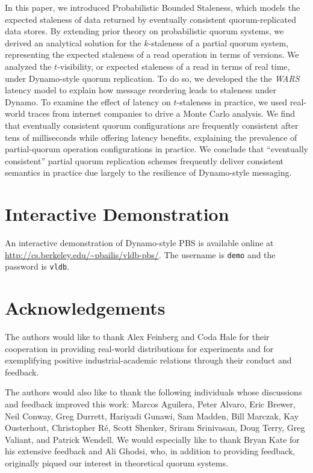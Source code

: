 \documentclass{vldb}
\newcommand{\sectionskip}{-0em}
\begin{document}
In this paper, we introduced Probabilistic Bounded Staleness, which
models the expected staleness of data returned by eventually
consistent quorum-replicated data stores.  By extending prior theory
on probabilistic quorum systems, we derived an analytical solution for
the $k$-staleness of a partial quorum system, representing the
expected staleness of a read operation in terms of versions.  We
analyzed the $t$-visibility, or expected staleness of a read in terms
of real time, under Dynamo-style quorum replication.  To do so, we
developed the the \textit{WARS} latency model to explain how message
reordering leads to staleness under Dynamo.  To examine the effect of
latency on $t$-staleness in practice, we used real-world traces from
internet companies to drive a Monte Carlo analysis.  We find that
eventually consistent quorum configurations are frequently consistent
after tens of milliseconds while offering latency benefits, explaining
the prevalence of partial-quorum operation configurations in practice.
We conclude that ``eventually consistent'' partial quorum replication
schemes frequently deliver consistent semantics in practice due
largely to the resilience of Dynamo-style messaging.

\vspace{\sectionskip}\section*{Interactive Demonstration}
An interactive demonstration of Dynamo-style PBS is available online
at \url{http://cs.berkeley.edu/~pbailis/vldb-pbs/}.  The username is
\texttt{demo} and the password is \texttt{vldb}.

\section*{Acknowledgements}

The authors would like to thank Alex Feinberg and Coda Hale for their
cooperation in providing real-world distributions for experiments and
for exemplifying positive industrial-academic relations through their
conduct and feedback.

The authors would also like to thank the following individuals whose
discussions and feedback improved this work: Marcos Aguilera, Peter
Alvaro, Eric Brewer, Neil Conway, Greg Durrett, Hariyadi Gunawi, Sam
Madden, Bill Marczak, Kay Ousterhout, Christopher R\'e, Scott Shenker,
Sriram Srinivasan, Doug Terry, Greg Valiant, and Patrick Wendell.  We
would especially like to thank Bryan Kate for his extensive feedback
and Ali Ghodsi, who, in addition to providing feedback, originally
piqued our interest in theoretical quorum systems.
\end{document}
